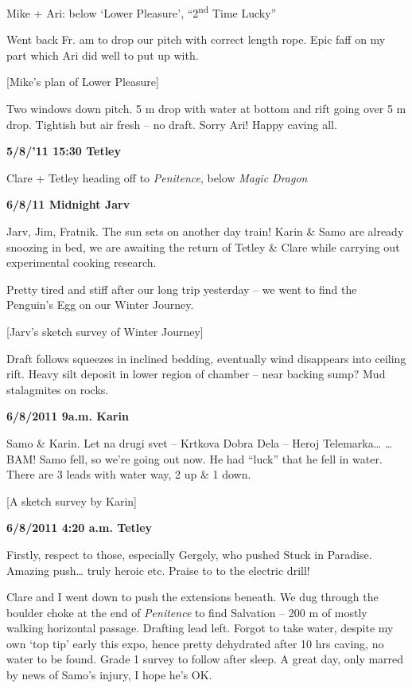 Mike + Ari: below `Lower Pleasure', ``2\textsuperscript{nd} Time Lucky''

Went back Fr. am to drop our pitch with correct length rope. Epic faff
on my part which Ari did well to put up with.

{[}Mike's plan of Lower Pleasure{]}

Two windows down pitch. 5 m drop with water at bottom and rift going
over 5 m drop. Tightish but air fresh -- no draft. Sorry Ari! Happy
caving all.

\textbf{5/8/'11 15:30 Tetley}

Clare + Tetley heading off to \emph{Penitence}, below \emph{Magic
Dragon}

\textbf{6/8/11 Midnight Jarv}

Jarv, Jim, Fratnik. The sun sets on another day train! Karin \& Samo are
already snoozing in bed, we are awaiting the return of Tetley \& Clare
while carrying out experimental cooking research.

Pretty tired and stiff after our long trip yesterday -- we went to find
the Penguin's Egg on our Winter Journey.

{[}Jarv's sketch survey of Winter Journey{]}

Draft follows squeezes in inclined bedding, eventually wind disappears
into ceiling rift. Heavy silt deposit in lower region of chamber -- near
backing sump? Mud stalagmites on rocks.

\textbf{6/8/2011 9a.m. Karin}

Samo \& Karin. Let na drugi svet -- Krtkova Dobra Dela -- Heroj
Telemarka\ldots{} \ldots{}BAM! Samo fell, so we're going out now. He had
``luck'' that he fell in water. There are 3 leads with water way, 2 up
\& 1 down.

{[}A sketch survey by Karin{]}

\textbf{6/8/2011 4:20 a.m. Tetley}

Firstly, respect to those, especially Gergely, who pushed Stuck in
Paradise. Amazing push\ldots{} truly heroic etc. Praise to to the
electric drill!

Clare and I went down to push the extensions beneath. We dug through the
boulder choke at the end of \emph{Penitence} to find Salvation -- 200 m
of mostly walking horizontal passage. Drafting lead left. Forgot to take
water, despite my own `top tip' early this expo, hence pretty dehydrated
after 10 hrs caving, no water to be found. Grade 1 survey to follow
after sleep. A great day, only marred by news of Samo's injury, I hope
he's OK.

